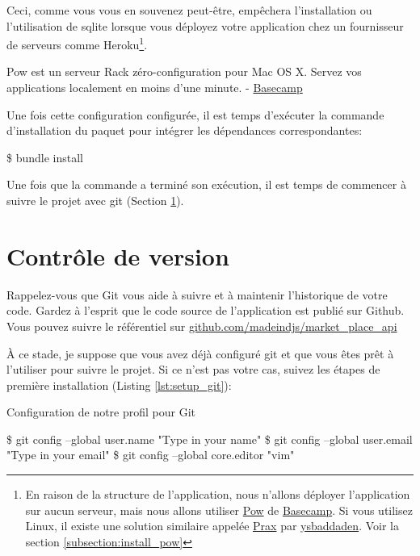\documentclass[]{report}
\begin{document}
      Ceci, comme vous vous en souvenez peut-être, empêchera l'installation ou l'utilisation de sqlite lorsque vous déployez votre application chez un fournisseur de serveurs comme Heroku\footnote{En raison de la structure de l'application, nous n'allons déployer l'application sur aucun serveur, mais nous allons utiliser \href{http://pow.cx/}{Pow} de \href{https://basecamp.com/}{Basecamp}. Si vous utilisez Linux, il existe une solution similaire appelée \href{https://github.com/ysbaddaden/prax.cr}{Prax} par \href{https://github.com/ysbaddaden}{ysbaddaden}. Voir la section \ref{subsection:install_pow}}.

      \begin{displayquote}
        Pow est un serveur Rack zéro-configuration pour Mac OS X. Servez vos applications localement en moins d'une minute. - \href{https://basecamp.com/}{Basecamp}
      \end{displayquote}

      Une fois cette configuration configurée, il est temps d'exécuter la commande d'installation du paquet pour intégrer les dépendances correspondantes:

      \begin{bashcode}
      \$ bundle install
      \end{bashcode}

      Une fois que la commande a terminé son exécution, il est temps de commencer à suivre le projet avec git (Section \ref{section:git}).

  \section{Contrôle de version}\label{section:git}

    Rappelez-vous que Git vous aide à suivre et à maintenir l'historique de votre code. Gardez à l'esprit que le code source de l'application est publié sur Github. Vous pouvez suivre le référentiel sur \href{https://github.com/madeindjs/market_place_api}{github.com/madeindjs/market\_place\_api}

    À ce stade, je suppose que vous avez déjà configuré git et que vous êtes prêt à l'utiliser pour suivre le projet. Si ce n'est pas votre cas, suivez les étapes de première installation (Listing \ref{lst:setup_git}):

    \begin{listing}
      \label{lst:setup_git}
      \caption{Configuration de notre profil pour Git}
      \begin{bashcode}
      \$ git config --global user.name "Type in your name"
      \$ git config --global user.email "Type in your email"
      \$ git config --global core.editor "vim"
      \end{bashcode}
    \end{listing}
\end{document}
